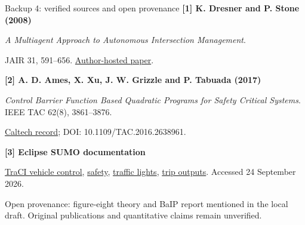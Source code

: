 \documentclass[aspectratio=169,11pt]{beamer}
\newcommand{\smallgap}{\par\vspace{2mm}}
\begin{document}
\begin{frame}{Backup 4: verified sources and open provenance}
\footnotesize
\textbf{[1] K. Dresner and P. Stone (2008)}\par
\emph{A Multiagent Approach to Autonomous Intersection Management}.\par
JAIR 31, 591--656. \href{https://www.cs.utexas.edu/~aim/papers/JAIR08-dresner.pdf}{Author-hosted paper}.\par
\smallgap
\textbf{[2] A. D. Ames, X. Xu, J. W. Grizzle and P. Tabuada (2017)}\par
\emph{Control Barrier Function Based Quadratic Programs for Safety Critical Systems}. IEEE TAC 62(8), 3861--3876.\par
\href{https://authors.library.caltech.edu/records/jnhr0-1ww05}{Caltech record}; DOI: 10.1109/TAC.2016.2638961.\par
\smallgap
\textbf{[3] Eclipse SUMO documentation}\par
\href{https://sumo.dlr.de/docs/TraCI/Change_Vehicle_State.html}{TraCI vehicle control},
\href{https://sumo.dlr.de/docs/Simulation/Safety.html}{safety},
\href{https://sumo.dlr.de/docs/Simulation/Traffic_Lights.html}{traffic lights},
\href{https://sumo.dlr.de/docs/Simulation/Output/TripInfo.html}{trip outputs}. Accessed 24 September 2026.\par
\smallgap
\alert{Open provenance:} figure-eight theory and BaIP report mentioned in the local draft. Original publications and quantitative claims remain unverified.
\end{frame}
\end{document}
